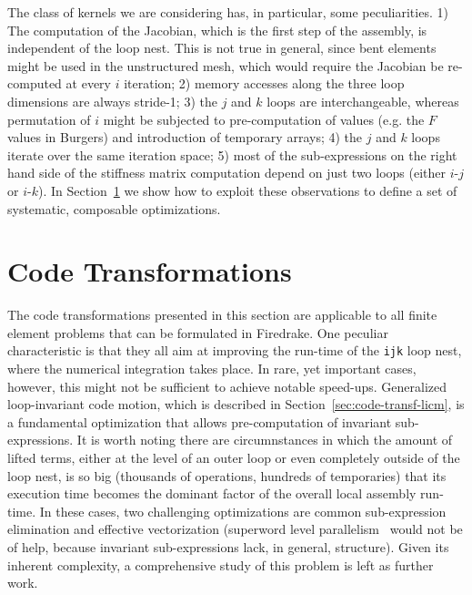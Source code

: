 \documentclass[conference]{IEEEtran}
\begin{document}
The class of kernels we are considering has, in particular, some peculiarities. 1) The computation of the Jacobian, which is the first step of the assembly, is independent of the loop nest. This is not true in general, since bent elements might be used in the unstructured mesh, which would require the Jacobian be re-computed at every $i$ iteration; 2) memory accesses along the three loop dimensions are always stride-1; 3) the $j$ and $k$ loops are interchangeable, whereas permutation of $i$ might be subjected to pre-computation of values (e.g. the $F$ values in Burgers) and introduction of temporary arrays; 4) the $j$ and $k$ loops iterate over the same iteration space; 5) most of the sub-expressions on the right hand side of the stiffness matrix computation depend on just two loops (either $i$-$j$ or $i$-$k$). In Section~\ref{sec:code-transf} we show how to exploit these observations to define a set of systematic, composable optimizations.


\section{Code Transformations}
\label{sec:code-transf}
The code transformations presented in this section are applicable to all finite element problems that can be formulated in Firedrake. One peculiar characteristic is that they all aim at improving the run-time of the \texttt{ijk} loop nest, where the numerical integration takes place. In rare, yet important cases, however, this might not be sufficient to achieve notable speed-ups. Generalized loop-invariant code motion, which is described in Section~\ref{sec:code-transf-licm}, is a fundamental optimization that allows pre-computation of invariant sub-expressions. It is worth noting there are circumnstances in which the amount of lifted terms, either at the level of an outer loop or even completely outside of the loop nest, is so big (thousands of operations, hundreds of temporaries) that its execution time becomes the dominant factor of the overall local assembly run-time. In these cases, two challenging optimizations are common sub-expression elimination and effective vectorization (superword level parallelism~\cite{SLP} would not be of help, because invariant sub-expressions lack, in general, structure). Given its inherent complexity, a comprehensive study of this problem is left as further work. 

\end{document}
